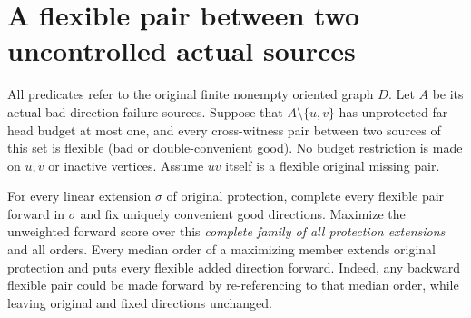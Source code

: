 \section{A flexible pair between two uncontrolled actual sources}
\label{sec:two-heavy-flexible-tail-reduction}

All predicates refer to the original finite nonempty oriented graph
$D$. Let $A$ be its actual bad-direction failure sources. Suppose that
$A\setminus\{u,v\}$ has unprotected far-head budget at most one,
and every cross-witness pair between two sources of this set is
flexible (bad or double-convenient good). No budget restriction is
made on $u,v$ or inactive vertices. Assume $uv$ itself is a flexible
original missing pair.

For every linear extension $\sigma$ of original protection, complete
every flexible pair forward in $\sigma$ and fix uniquely convenient
good directions. Maximize the unweighted forward score over this
\emph{complete family of all protection extensions} and all orders.
Every median order of a maximizing member extends original protection
and puts every flexible added direction forward. Indeed, any backward
flexible pair could be made forward by re-referencing to that median
order, while leaving original and fixed directions unchanged.

